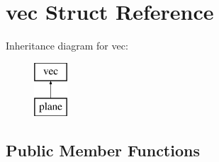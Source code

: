 \hypertarget{structvec}{}\section{vec Struct Reference}
\label{structvec}
Inheritance diagram for vec\+:\begin{figure}[H]
\begin{center}
\leavevmode
\includegraphics[height=2.000000cm]{structvec}
\end{center}
\end{figure}
\subsection*{Public Member Functions}
